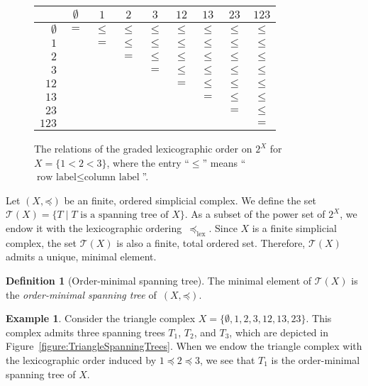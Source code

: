 \documentclass[oneside]{amsart}
\theoremstyle{definition}
\newtheorem{definition}[theorem]{Definition}
\newtheorem{example}[theorem]{Example}
\newcommand\lex{\mathrm{lex}}
\begin{document}
\begin{figure}
    \centering
    \begin{tabular}{r|cccccccc}
                    & $\emptyset$ & $1$    & $2$    & $3$    & $12$   & $13$   & $23$   & $123$  \\ \hline
        $\emptyset$ & $=$         & $\leq$ & $\leq$ & $\leq$ & $\leq$ & $\leq$ & $\leq$ & $\leq$ \\
        $1$         &             & $=$    & $\leq$ & $\leq$ & $\leq$ & $\leq$ & $\leq$ & $\leq$ \\
        $2$         &             &        & $=$    & $\leq$ & $\leq$ & $\leq$ & $\leq$ & $\leq$ \\
        $3$         &             &        &        & $=$    & $\leq$ & $\leq$ & $\leq$ & $\leq$ \\
        $12$        &             &        &        &        & $=$    & $\leq$ & $\leq$ & $\leq$ \\
        $13$        &             &        &        &        &        & $=$    & $\leq$ & $\leq$ \\
        $23$        &             &        &        &        &        &        & $=$    & $\leq$ \\
        $123$       &             &        &        &        &        &        &        & $=$
    \end{tabular}

    \caption{The relations of the graded lexicographic order on $2^X$ for $X = \{ 1 < 2 < 3 \}$, where the entry \enquote{$\leq$} means \enquote{$\text{row label} \leq \text{column label}$}.}
    \label{figure:123GrLexOrder}
\end{figure}

Let $(X, \mathord\preceq)$ be an finite, ordered simplicial complex.
We define the set $\mathcal T(X) = \{ T \mid \text{$T$ is a spanning tree of $X$} \}$.
As a subset of the power set of $2^X$, we endow it with the lexicographic ordering~$\preceq_\lex$.
Since $X$ is a finite simplicial complex, the set $\mathcal T(X)$ is also a finite, total ordered set.
Therefore, $\mathcal T(X)$ admits a unique, minimal element.

\begin{definition}[Order-minimal spanning tree]
    The minimal element of $\mathcal T(X)$ is the \emph{order-minimal spanning tree} of~$(X, \mathord\preceq)$.
\end{definition}

\begin{example}
    Consider the triangle complex $X = \{ \emptyset, 1, 2, 3, 12, 13, 23 \}$.
    This complex admits three spanning trees $T_1$, $T_2$, and $T_3$, which are depicted in Figure~\ref{figure:TriangleSpanningTrees}.
    When we endow the triangle complex with the lexicographic order induced by $1 \preceq 2 \preceq 3$, we see that $T_1$ is the order-minimal spanning tree of $X$.
\end{example}
\end{document}
